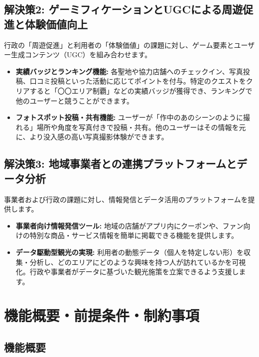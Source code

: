 \documentclass{docs}
\begin{document}
\subsection{解決策2: ゲーミフィケーションとUGCによる周遊促進と体験価値向上}
行政の「周遊促進」と利用者の「体験価値」の課題に対し、ゲーム要素とユーザー生成コンテンツ（UGC）を組み合わせます。
\begin{itemize}
    \item \textbf{実績バッジとランキング機能:} 各聖地や協力店舗へのチェックイン、写真投稿、口コミ投稿といった活動に応じてポイントを付与。特定のクエストをクリアすると「〇〇エリア制覇」などの実績バッジが獲得でき、ランキングで他のユーザーと競うことができます。
    \item \textbf{フォトスポット投稿・共有機能:} ユーザーが「作中のあのシーンのように撮れる」場所や角度を写真付きで投稿・共有。他のユーザーはその情報を元に、より没入感の高い写真撮影体験ができます。
\end{itemize}

\subsection{解決策3: 地域事業者との連携プラットフォームとデータ分析}
事業者および行政の課題に対し、情報発信とデータ活用のプラットフォームを提供します。
\begin{itemize}
    \item \textbf{事業者向け情報発信ツール:} 地域の店舗がアプリ内にクーポンや、ファン向けの特別な商品・サービス情報を簡単に掲載できる機能を提供します。
    \item \textbf{データ駆動型観光の実現:} 利用者の動態データ（個人を特定しない形）を収集・分析し、どのエリアにどのような興味を持つ人が訪れているかを可視化。行政や事業者がデータに基づいた観光施策を立案できるよう支援します。
\end{itemize}

\section{機能概要・前提条件・制約事項}

\subsection{機能概要}
\end{document}

